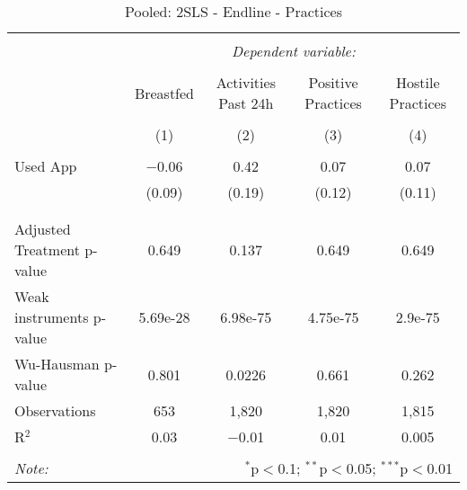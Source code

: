 
\begin{table}[!htbp] \centering 
  \caption{Pooled: 2SLS - Endline - Practices} 
  \label{tbl:Pooled: 2SLS - Endline - Practices} 
\begin{tabular}{@{\extracolsep{5pt}}lcccc} 
\\[-1.8ex]\hline 
\hline \\[-1.8ex] 
 & \multicolumn{4}{c}{\textit{Dependent variable:}} \\ 
\cline{2-5} 
\\[-1.8ex] & Breastfed & Activities Past 24h & Positive Practices & Hostile Practices \\ 
\\[-1.8ex] & (1) & (2) & (3) & (4)\\ 
\hline \\[-1.8ex] 
 Used App & $-$0.06 & 0.42 & 0.07 & 0.07 \\ 
  & (0.09) & (0.19) & (0.12) & (0.11) \\ 
  & & & & \\ 
\hline \\[-1.8ex] 
Adjusted Treatment p-value & 0.649 & 0.137 & 0.649 & 0.649 \\ 
Weak instruments p-value & 5.69e-28 & 6.98e-75 & 4.75e-75 & 2.9e-75 \\ 
Wu-Hausman p-value & 0.801 & 0.0226 & 0.661 & 0.262 \\ 
Observations & 653 & 1,820 & 1,820 & 1,815 \\ 
R$^{2}$ & 0.03 & $-$0.01 & 0.01 & 0.005 \\ 
\hline 
\hline \\[-1.8ex] 
\textit{Note:}  & \multicolumn{4}{r}{$^{*}$p$<$0.1; $^{**}$p$<$0.05; $^{***}$p$<$0.01} \\ 
\end{tabular} 
\end{table} 
